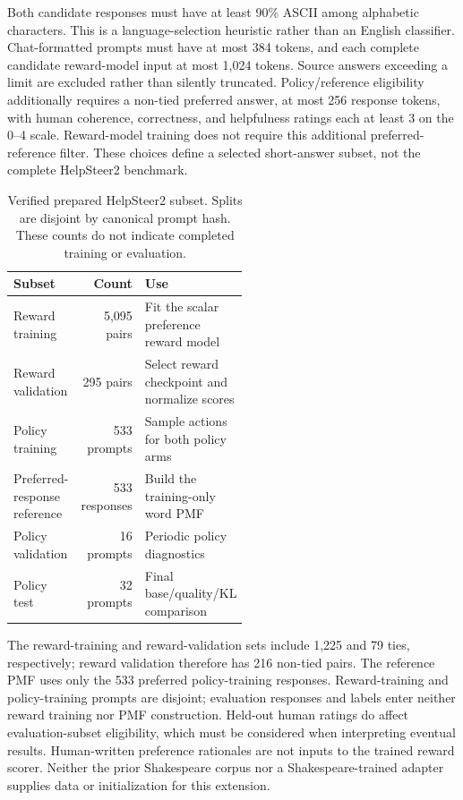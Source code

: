 Both candidate responses must have at least 90\% ASCII among alphabetic
characters. This is a language-selection heuristic rather than an English
classifier. Chat-formatted prompts must have at most 384 tokens, and
each complete candidate reward-model input at most 1,024 tokens. Source
answers exceeding a limit are excluded rather than silently truncated.
Policy/reference eligibility additionally requires a non-tied preferred
answer, at most 256 response tokens, with human coherence, correctness,
and helpfulness ratings each at least 3 on the 0--4 scale. Reward-model
training does not require this additional preferred-reference filter.
These choices define a selected short-answer subset, not the complete
HelpSteer2 benchmark.

\begin{table}[htbp]
\centering\small
\caption{Verified prepared HelpSteer2 subset. Splits are disjoint by canonical
prompt hash. These counts do not indicate completed training or evaluation.}
\label{tab:helpsteerdata}
\begin{tabular}{@{}lrp{0.52\linewidth}@{}}
\toprule
Subset & Count & Use\\
\midrule
Reward training & 5,095 pairs & Fit the scalar preference reward model\\
Reward validation & 295 pairs & Select reward checkpoint and normalize scores\\
Policy training & 533 prompts & Sample actions for both policy arms\\
Preferred-response reference & 533 responses & Build the training-only word PMF\\
Policy validation & 16 prompts & Periodic policy diagnostics\\
Policy test & 32 prompts & Final base/quality/KL comparison\\
\bottomrule
\end{tabular}
\end{table}

The reward-training and reward-validation sets include 1,225 and 79 ties,
respectively; reward validation therefore has 216 non-tied pairs.
The reference PMF uses only the 533 preferred policy-training responses.
Reward-training and policy-training prompts are disjoint; evaluation
responses and labels enter neither reward training nor PMF construction.
Held-out human ratings do affect evaluation-subset eligibility, which must
be considered when interpreting eventual results. Human-written preference
rationales are not inputs to the trained reward scorer. Neither the prior
Shakespeare corpus nor a Shakespeare-trained adapter supplies data or
initialization for this extension.

